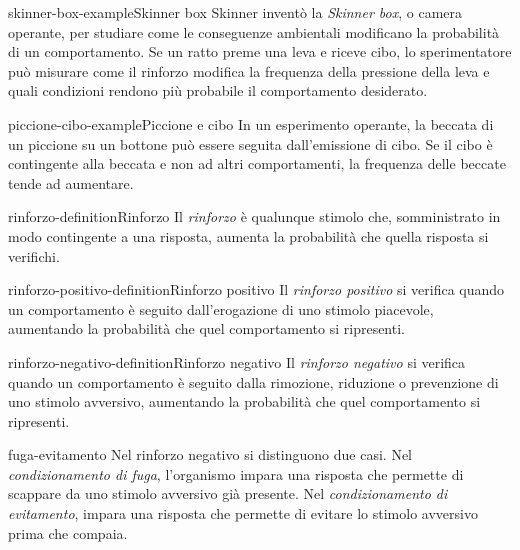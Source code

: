 \documentclass[preview]{standalone}
\begin{document}
\begin{snippetexample}{skinner-box-example}{Skinner box}
    Skinner inventò la \emph{Skinner box}, o camera operante, per studiare come
    le conseguenze ambientali modificano la probabilità di un comportamento. Se
    un ratto preme una leva e riceve cibo, lo sperimentatore può misurare come
    il rinforzo modifica la frequenza della pressione della leva e quali
    condizioni rendono più probabile il comportamento desiderato.
\end{snippetexample}


\begin{snippetexample}{piccione-cibo-example}{Piccione e cibo}
    In un esperimento operante, la beccata di un piccione su un bottone può
    essere seguita dall'emissione di cibo. Se il cibo è contingente alla beccata
    e non ad altri comportamenti, la frequenza delle beccate tende ad aumentare.
\end{snippetexample}

\begin{snippetdefinition}{rinforzo-definition}{Rinforzo}
    Il \emph{rinforzo} è qualunque stimolo che, somministrato in modo
    contingente a una risposta, aumenta la probabilità che quella risposta si
    verifichi.
\end{snippetdefinition}

\begin{snippetdefinition}{rinforzo-positivo-definition}{Rinforzo positivo}
    Il \emph{rinforzo positivo} si verifica quando un comportamento è seguito
    dall'erogazione di uno stimolo piacevole, aumentando la probabilità che quel
    comportamento si ripresenti.
\end{snippetdefinition}

\begin{snippetdefinition}{rinforzo-negativo-definition}{Rinforzo negativo}
    Il \emph{rinforzo negativo} si verifica quando un comportamento è seguito
    dalla rimozione, riduzione o prevenzione di uno stimolo avversivo,
    aumentando la probabilità che quel comportamento si ripresenti.
\end{snippetdefinition}

\begin{snippet}{fuga-evitamento}
    Nel rinforzo negativo si distinguono due casi. Nel \emph{condizionamento di
    fuga}, l'organismo impara una risposta che permette di scappare da uno
    stimolo avversivo già presente. Nel \emph{condizionamento di evitamento},
    impara una risposta che permette di evitare lo stimolo avversivo prima che
    compaia.
\end{snippet}
\end{document}
